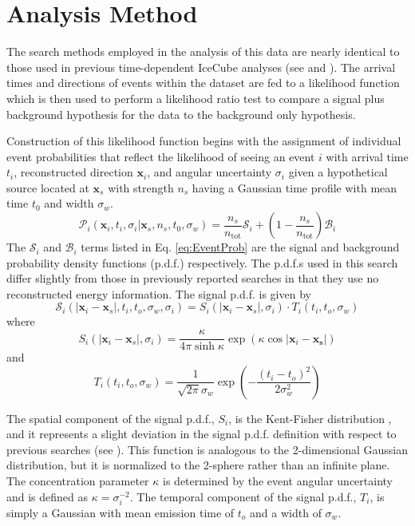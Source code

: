 \documentclass[manuscript]{aastex}
\begin{document}
\section{Analysis Method}
The search methods employed in the analysis of this data are nearly identical to those used in previous time-dependent IceCube analyses (see \cite{2008APh....29..299B} and \cite{2015arXiv150300598A}). The arrival times and directions of events within the dataset are fed to a likelihood function which is then used to perform a likelihood ratio test to compare a signal plus background hypothesis for the data to the background only hypothesis.

Construction of this likelihood function begins with the assignment of individual event probabilities that reflect the likelihood of seeing an event $i$ with arrival time $t_i$, reconstructed direction $\mathbf{x}_i$, and angular uncertainty $\sigma_i$ given a hypothetical source located at $\mathbf{x}_s$ with strength $n_s$ having a Gaussian time profile with mean time $t_0$ and width $\sigma_w$.
\begin{equation}\label{eq:EventProb}
\mathcal{P}_i(\mathbf{x}_i,t_i,\sigma_i|\mathbf{x}_s,n_s,t_0,\sigma_w) = \frac{n_s}{n_{\mathrm{tot}}} \mathcal{S}_i + \left(1-\frac{n_s}{n_{\mathrm{tot}}}\right) \mathcal{B}_i
\end{equation}
The $\mathcal{S}_i$ and $\mathcal{B}_i$ terms listed in Eq. \ref{eq:EventProb} are the signal and background probability density functions (p.d.f.) respectively. The p.d.f.s used in this search differ slightly from those in previously reported searches in that they use no reconstructed energy information. The signal p.d.f. is given by
\begin{equation}
\mathcal{S}_i(|\mathbf{x}_i-\mathbf{x}_s|,t_i,t_o,\sigma_w,\sigma_i) = S_i(|\mathbf{x}_i-\mathbf{x}_s|,\sigma_i) \cdot T_i(t_i,t_o,\sigma_w)
\end{equation}
where 
\begin{equation}
S_i(|\mathbf{x}_i-\mathbf{x}_s|,\sigma_i) = \frac{\kappa}{4\pi \sinh \kappa} \exp \left(\kappa \cos |\mathbf{x}_i-\mathbf{x_s}|\right)
\end{equation}
and
\begin{equation}
T_i(t_i,t_o,\sigma_w) = \frac{1}{\sqrt{2\pi}\sigma_w} \exp \left(-\frac{(t_i-t_o)^2}{2 \sigma_w^2}\right)
\end{equation}

The spatial component of the signal p.d.f., $S_i$, is the Kent-Fisher distribution \citep{Fisher_Bingham}, and it represents a slight deviation in the signal p.d.f. definition with respect to previous searches (see \cite{2014ApJ...796..109A}). This function is analogous to the 2-dimensional Gaussian distribution, but it is normalized to the 2-sphere rather than an infinite plane. The concentration parameter $\kappa$ is determined by the event angular uncertainty and is defined as $\kappa = \sigma_{i}^{-2}$. The temporal component of the signal p.d.f., $T_i$, is simply a Gaussian with mean emission time of $t_o$ and a width of $\sigma_w$.
\end{document}
